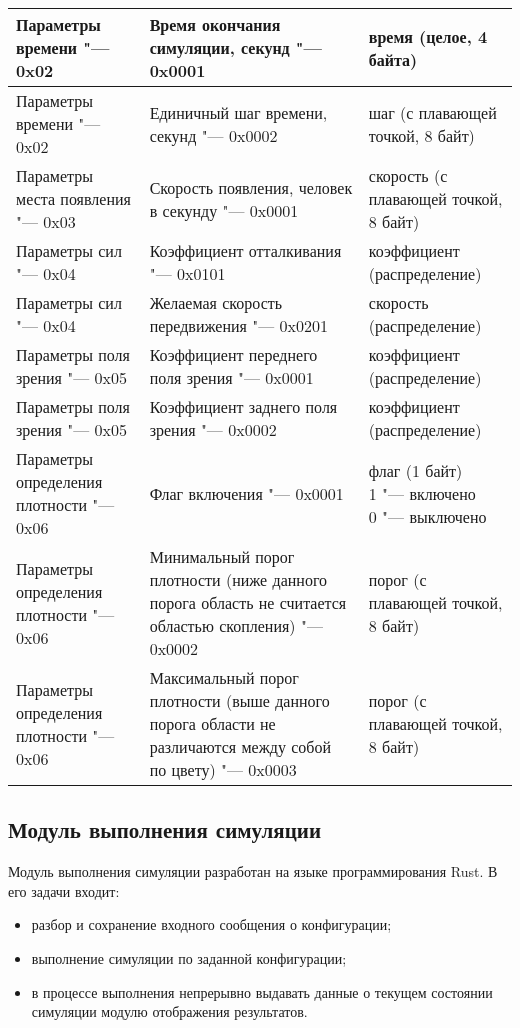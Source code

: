 \begin{longtable}[ht]{| >{\centering}m{}
                      | >{\centering}m{}
                      | >{\centering\arraybackslash}m{}|}
  \hline Параметры времени "--- 0x02 & Время окончания симуляции, секунд "--- 0x0001 & время (целое, 4 байта) \tabularnewline
  \hline Параметры времени "--- 0x02 & Единичный шаг времени, секунд "--- 0x0002 & шаг (с плавающей точкой, 8 байт) \tabularnewline

  \hline Параметры места появления "--- 0x03 & Скорость появления, человек в секунду "--- 0x0001 & скорость (с плавающей точкой, 8 байт) \tabularnewline

  \hline Параметры сил "--- 0x04 & Коэффициент отталкивания "--- 0x0101 & коэффициент (распределение) \tabularnewline
  \hline Параметры сил "--- 0x04 & Желаемая скорость передвижения "--- 0x0201 & скорость (распределение) \tabularnewline

  \hline Параметры поля зрения "--- 0x05 & Коэффициент переднего поля зрения "--- 0x0001 & коэффициент (распределение) \tabularnewline
  \hline Параметры поля зрения "--- 0x05 & Коэффициент заднего поля зрения "--- 0x0002 & коэффициент (распределение) \tabularnewline

  \hline Параметры определения плотности "--- 0x06 & Флаг включения "--- 0x0001 & \specialcell{флаг (1 байт)\\
                                                                                               1 "--- включено\\
                                                                                               0 "--- выключено} \tabularnewline
  \hline Параметры определения плотности "--- 0x06 & Минимальный порог плотности (ниже данного порога область не считается областью скопления) "--- 0x0002 & порог (с плавающей точкой, 8 байт) \tabularnewline
  \hline Параметры определения плотности "--- 0x06 & Максимальный порог плотности (выше данного порога области не различаются между собой по цвету) "--- 0x0003 & порог (с плавающей точкой, 8 байт) \tabularnewline

  \hline
\end{longtable}

\subsection{Модуль выполнения симуляции}
\label{sec:development:core}

Модуль выполнения симуляции разработан на языке программирования Rust.
В его задачи входит:
\begin{itemize}
  \item разбор и сохранение входного сообщения о конфигурации;
  \item выполнение симуляции по заданной конфигурации;
  \item в процессе выполнения непрерывно выдавать данные о текущем состоянии симуляции модулю отображения результатов.
\end{itemize}

